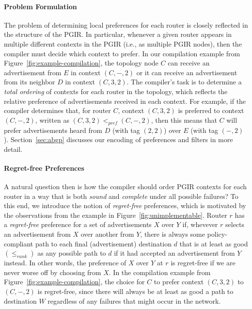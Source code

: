 \documentclass[10pt]{sigalternate052015}
\newcommand{\para}[1]{\paragraph*{\textbf{#1}}}
\begin{document}
\para{Problem Formulation}

The problem of determining local preferences for each router is closely reflected in the structure of the PGIR. In particular, whenever a given router appears in multiple different contexts in the PGIR (i.e., as multiple PGIR nodes), then the compiler must decide which context to prefer.
%
In our compilation example from Figure~\ref{fig:example-compilation}, the topology node $C$ can receive an advertisement from $E$ in context $(C,-,2)$ or it can receive an advertisement from its neighbor $D$ in context $(C,3,2)$. 
%
The compiler's task is to determine a \emph{total ordering} of contexts for each router in the topology, which reflects the relative preference of advertisements received in each context. For example, if the compiler determines that, for router $C$, context $(C,3,2)$ is preferred to context $(C,-,2)$, written as $(C,3,2) <_{pref} (C,-,2)$, then this means that $C$ will prefer advertisements heard from $D$ (with tag $(2,2)$) over $E$ (with tag $(-,2)$). Section~\ref{sec:abgp} discusses our encoding of preferences and filters in more detail.

\para{Regret-free Preferences}

A natural question then is how the compiler should order PGIR contexts for each router in a way that is both \emph{sound} and \emph{complete} under all possible failures? To this end, we introduce the notion of \emph{regret-free} preferences, which is motivated by the observations from the example in Figure~\ref{fig:unimplementable}. Router $r$ has a \emph{regret-free} preference for a set of advertisements $X$ over $Y$ if, whevever $r$ selects an advertisement from $X$ over another from $Y$, there is always some policy-compliant path to each final (advertisement) destination $d$ that is at least as good $(\leq_{rank})$ as any possible path to $d$ if it had accepted an advertisement from $Y$ instead. In other words, the preference of $X$ over $Y$ at $r$ is regret-free if we are never worse off by choosing from $X$.
%
In the compilation example from Figure~\ref{fig:example-compilation}, the choice for $C$ to prefer context $(C,3,2)$ to $(C,-,2)$ is regret-free, since there will always be at least as good a path to destination $W$ regardless of any failures that might occur in the network. 

%
%
%
\end{document}
